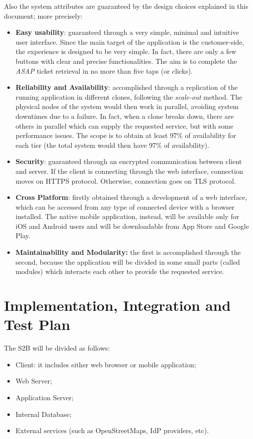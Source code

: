 \documentclass[table, 12pt]{article}
\begin{document}
Also the system attributes are guaranteed by the design choices explained in this document; more precisely:
\begin{itemize}
    \item \textbf{Easy usability}: guaranteed through a very simple, minimal and intuitive user interface. Since the main target of the application is the customer-side, the experience is designed to be very simple. In fact, there are only a few buttons with clear and precise functionalities. The aim is to complete the \textit{ASAP} ticket retrieval in no more than five taps (or clicks).
    \item \textbf{Reliability and Availability}: accomplished through a replication of the running application in different clones, following the \textit{scale-out} method. The physical nodes of the system would then work in parallel, avoiding system downtimes due to a failure. In fact, when a clone breaks down, there are others in parallel which can supply the requested service, but with some performance issues. The scope is to obtain at least 97\% of availability for each tier (the total system would then have 97\% of availability).
    \item \textbf{Security}: guaranteed through an encrypted communication between client and server. If the client is connecting through the web interface, connection moves on HTTPS protocol. Otherwise, connection goes on TLS protocol.
    \item \textbf{Cross Platform}: firstly obtained through a development of a web interface, which can be accessed from any type of connected device with a browser installed. The native mobile application, instead, will be available only for iOS and Android users and will be downloadable from App Store and Google Play.
    \item \textbf{Maintainability and Modularity:} the first is accomplished through the second, because the application will be divided in some small parts (called modules) which interacts each other to provide the requested service.
\end{itemize}

\section{Implementation, Integration and Test Plan}
The S2B will be divided as follows:
\begin{itemize}
    \item Client: it includes either web browser or mobile application;
    \item Web Server;
    \item Application Server;
    \item Internal Database;
    \item External services (such as OpenStreetMaps, IdP providers, etc).
\end{itemize}
\end{document}
